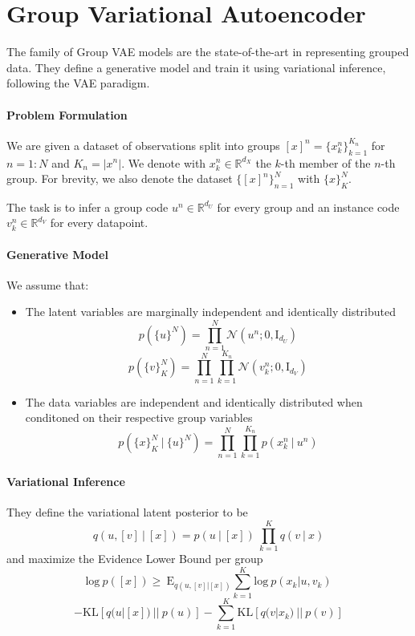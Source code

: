 \documentclass{article}
\begin{document}
\section{Group Variational Autoencoder}

The family of Group VAE models \citep{Bouchacourt2018MultiLevelVA, Hosoya2019GroupbasedLO, Nmeth2020AdversarialDW} are the state-of-the-art in representing grouped data. They define a generative model and train it using variational inference, following the VAE paradigm.

\paragraph{Problem Formulation}
We are given a dataset of observations split into groups $[x]^n = \{x_k^n\}_{k=1}^{K_n}$ for $n = 1:N$ and $K_n = |x^n|$. We denote with $x_k^n \in \mathbb{R}^{d_X}$ the $k$-th member of the $n$-th group. For brevity, we also denote the dataset $\{[x]^n\}_{n=1}^N$ with $\{x\}_K^N$.

The task is to infer a group code $u^n \in \mathbb{R}^{d_U}$ for every group and an instance code $v^n_k \in \mathbb{R}^{d_V}$ for every datapoint.

\paragraph{Generative Model}
We assume that:
\begin{itemize}
    \item The latent variables are marginally independent and identically distributed $$p (\{u\}^N) = \prod_{n=1}^N \mathcal{N}(u^n; 0, \textrm{I}_{d_U})$$$$p(\{v\}_K^N) = \prod_{n=1}^N \prod_{k=1}^{K_n} \mathcal{N}(v_k^n; 0, \textrm{I}_{d_V})$$
    \item The data variables are independent and identically distributed when conditoned on their respective group variables $$p (\{x\}_K^N ~|~ \{u\}^N) = \prod_{n=1}^N \prod_{k=1}^{K_n} p(x_k^n ~|~ u^n)$$
\end{itemize}

\paragraph{Variational Inference}
They define the variational latent posterior to be $$q(u, [v] ~|~ [x]) = p (u ~|~ [x]) ~ \prod_{k=1}^K q (v ~|~ x)$$ and maximize the Evidence Lower Bound per group $$\textrm{log} ~ p ([x]) \geq~ \textrm{E}_{q (u, [v] | [x])} \sum_{k=1}^{K} \textrm{log} ~ p(x_k|u, v_k)$$ $$- \textrm{KL} [q(u|[x]) ~||~ p(u)] - \sum_{k=1}^{K} \textrm{KL} [q(v|x_k) ~||~ p(v)]$$
\end{document}
